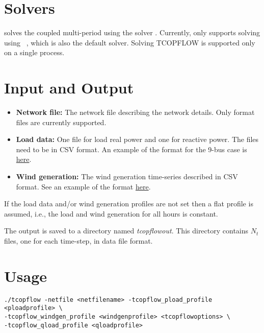 \section{Solvers}\label{sec:tcopflow_solvers}%
\tcopflow solves the coupled multi-period using the solver \ipopt. Currently, \exago only supports solving \tcopflow using \ipopt~, which is also the default solver. Solving TCOPFLOW is supported only on a single process. %

\section{Input and Output}
\begin{itemize}
    \item \textbf{Network file:} The network file describing the network details. Only \matpower format files are currently supported.
    \item \textbf{Load data:} One file for load real power and one for reactive power. The files need to be in CSV format. An example of the format for the 9-bus case is \href{https://gitlab.pnnl.gov/exasgd/frameworks/exago/-/tree/master/datafiles/case9}{here}.
    \item \textbf{Wind generation:} The wind generation time-series described in CSV format. See an example of the format \href{https://gitlab.pnnl.gov/exasgd/frameworks/exago/-/tree/master/datafiles/case9}{here}.
\end{itemize}
If the load data and/or wind generation profiles are not set then a flat profile is assumed, i.e., the load and wind generation for all hours is constant.

The \tcopflow output is saved to a directory named \emph{tcopflowout}. This directory contains $N_t$ files, one for each time-step, in \matpower data file format.

\section{Usage}
\begin{lstlisting}
./tcopflow -netfile <netfilename> -tcopflow_pload_profile <ploadprofile> \
-tcopflow_windgen_profile <windgenprofile> <tcopflowoptions> \
-tcopflow_qload_profile <qloadprofile>
\end{lstlisting}
